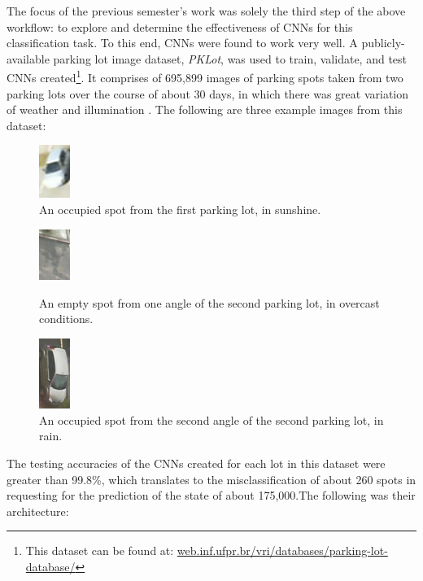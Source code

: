 \documentclass[a4paper, 11pt]{article} %
\begin{document}
	The focus of the previous semester's work was solely the third step of the above workflow: to 
	explore and determine the effectiveness of CNNs for this classification task. To this end, CNNs were 
	found to work very well. A publicly-available parking lot image dataset, \textit{PKLot}, was used to 
	train, validate, and test CNNs created\footnote{This dataset can be found at: 
	\hyperlink{https://web.inf.ufpr.br/vri/databases/parking-lot-database/}
	{web.inf.ufpr.br/vri/databases/parking-lot-database/}}. It comprises of 695,899 images of 
	parking spots taken from two parking lots over the course of about 30 days, in which there was 
	great variation of weather and illumination \cite{pklot-paper}\relax. The following are three example 
	images from this dataset:
	\vskip 5mm
	\begin{figure}[H]
		\centering
		\includegraphics[width=1cm]{figures/pklot_example_1.jpg}
		\caption{An occupied spot from the first parking lot, in sunshine.}
	\end{figure}
	\begin{figure}[H]
		\centering
		\includegraphics[width=1cm]{figures/pklot_example_2.jpg}
		\caption{An empty spot from one angle of the second parking lot, in overcast conditions.}
		\vspace{5mm}
		\includegraphics[width=1cm]{figures/pklot_example_3.jpg}
		\caption{An occupied spot from the second angle of the second parking lot, in rain.}
	\end{figure}
	\hspace*{-6mm}The testing accuracies of the CNNs created for each lot in this dataset were greater 
	than 99.8\%, which translates to the misclassification of about 260 spots in requesting for the 
	prediction of the state of about 175,000.The following was their architecture:
\end{document}
